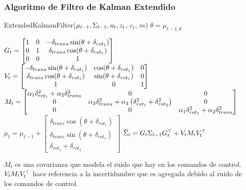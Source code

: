 \begin{frame}
    \frametitle{Algoritmo de Filtro de Kalman Extendido}
    \footnotesize
     \begin{algorithmic}[1]
        \State ExtendedKalmanFilter({$\mu_{t-1}, \Sigma_{t-1}, u_{t}, z_{t}$, $c_{t}$, $m$})
        \State $\theta = \mu_{t-1,\theta}$
        
        \State $
            G_{t} = 
            \begin{bmatrix}
                1 & 0 & -\delta_{trans} \sin(\theta + \delta_{rot_{1}})\\
                0 & 1 & \delta_{trans} \cos(\theta + \delta_{rot_{1}})\\
                0 & 0 & 1\\
            \end{bmatrix}
               $
        \State $
            V_{t} = 
            \begin{bmatrix}
                -\delta_{trans} \sin(\theta + \delta_{rot_{1}}) & \cos(\theta + \delta_{rot_{1}}) & 0\\
                \delta_{trans} \cos(\theta + \delta_{rot_{1}}) & \sin(\theta + \delta_{rot_{1}}) & 0\\
                1 & 0 & 1\\
            \end{bmatrix}
                $
        \State $
            M_{t} = 
            \begin{bmatrix}
                \alpha_{1}\delta^{2}_{rot_{1}} + \alpha_{2}\delta^{2}_{trans} & 0 & 0\\
                0 & \alpha_{3} \delta^{2}_{trans} + \alpha_{4} \left( \delta^{2}_{rot_{1}} + \delta^{2}_{rot_{2}} \right) & 0\\
                0 & 0 & \alpha_{1}\delta^{2}_{rot_{1}} + \alpha_{2}\delta^{2}_{trans}\\
            \end{bmatrix}
              $
        \State $\overline{\mu}_{t} = \mu_{t-1} + 
            \begin{bmatrix}
            \delta_{trans}\cos(\theta+\delta_{rot_{1}}) \\
            \delta_{trans}\sin(\theta+\delta_{rot_{1}}) \\
            \delta_{rot_{1}} + \delta_{rot_{2}}
        \end{bmatrix}$
        \State $\overline{\Sigma}_{t} = G_{t} \Sigma_{t-1} G_{t}^{\top}+V_{t} M_{t} V_{t}^{\top}$ 
    \end{algorithmic}
    \vspace{1em}
    $M_{t}$ es una covarianza que modela el ruido que hay en los comandos de control.
    $V_{t} M_{t} V_{t}^{\top}$ hace referencia a la incertidumbre que es agregada debido al ruido de los comandos de control.
    
\end{frame}

